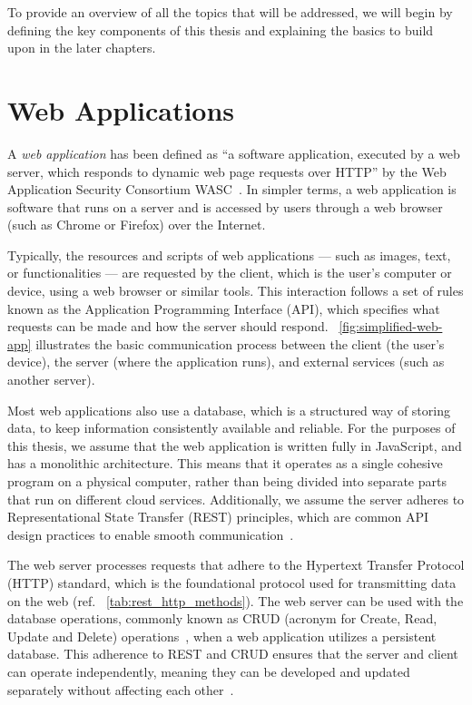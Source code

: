 \raggedbottom
To provide an overview of all the topics that will be addressed, we will begin by defining the key components of this thesis and explaining the basics to build upon in the later chapters. 

\section{Web Applications}
\label{sec:webapp}
A \textit{web application} has been defined as “a software application, executed by a web server, which responds to dynamic web page requests over HTTP” by the Web Application Security Consortium WASC~\cite{noauthor_web_2012}. 
In simpler terms, a web application is software that runs on a server and is accessed by users through a web browser (such as Chrome or Firefox) over the Internet.

Typically, the resources and scripts of web applications — such as images, text, or functionalities — are requested by the client, which is the user's computer or device, using a web browser or similar tools. This interaction follows a set of rules known as the Application Programming Interface (API), which specifies what requests can be made and how the server should respond.
~\autoref{fig:simplified-web-app} illustrates the basic communication process between the client (the user's device), the server (where the application runs), and external services (such as another server).

Most web applications also use a database, which is a structured way of storing data, to keep information consistently available and reliable. For the purposes of this thesis, we assume that the web application is written fully in JavaScript, and has a monolithic architecture. This means that it operates as a single cohesive program on a physical computer, rather than being divided into separate parts that run on different cloud services.
Additionally, we assume the server adheres to Representational State Transfer (REST) principles, which are common API design practices to enable smooth communication~\citet{roy_t_fielding_rest_2008}. 

The web server processes requests that adhere to the Hypertext Transfer Protocol (HTTP) standard, which is the foundational protocol used for transmitting data on the web (ref. ~\autoref{tab:rest_http_methods}). The web server can be used with the database operations, commonly known as CRUD (acronym for Create, Read, Update and Delete) operations~\citet{martin_managing_1983}, when a web application utilizes a persistent database.
This adherence to REST and CRUD ensures that the server and client can operate independently, meaning they can be developed and updated separately without affecting each other~\cite{fielding_http_2022}.



